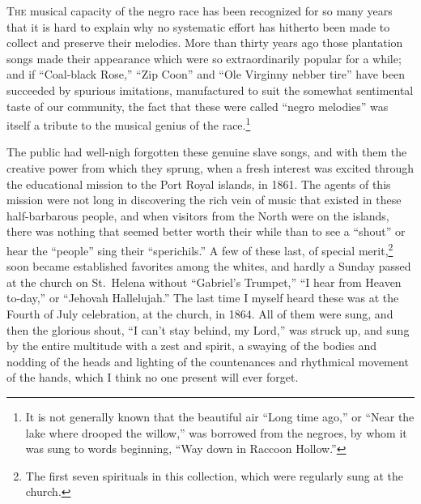 \documentclass[a5paper,10pt]{book}
\begin{document}
\textsc{The} musical capacity of the negro race has been recognized
for so many years that it is hard to explain why no systematic effort
has hitherto been made to collect and preserve their melodies.  More
than thirty years ago those plantation songs made their appearance
which were so extraordinarily popular for a while; and if ``Coal-black
Rose,'' ``Zip Coon'' and ``Ole Virginny nebber tire'' have been
succeeded by spurious imitations, manufactured to suit the somewhat
sentimental taste of our community, the fact that these were called
``negro melodies'' was itself a tribute to the musical genius of the
race.\footnote{It is not generally known that the beautiful air ``Long
time ago,'' or ``Near the lake where drooped the willow,'' was
borrowed from the negroes, by whom it was sung to words beginning,
``Way down in Raccoon Hollow.''}

The public had well-nigh forgotten these genuine slave songs, and with
them the creative power from which they sprung, when a fresh interest
was excited through the educational mission to the Port Royal islands,
in 1861.  The agents of this mission were not long in discovering the
rich vein of music that existed in these half-barbarous people, and
when visitors from the North were on the islands, there was nothing
that seemed better worth their while than to see a ``shout'' or hear
the ``people'' sing their ``sperichils.''  A few of these last, of
special merit,\footnote{The first seven spirituals in this collection,
which were regularly sung at the church.} soon became established
favorites among the whites, and hardly a Sunday passed at the church
on St.~Helena without ``Gabriel's Trumpet,'' ``I hear from Heaven
to-day,'' or ``Jehovah Hallelujah.''  The last time I myself heard
these was at the Fourth of July celebration, at the church, in 1864.
All of them were sung, and then the glorious shout, ``I can't stay
behind, my Lord,'' was struck up, and sung by the entire multitude
with a zest and spirit, a swaying of the bodies and nodding of the
heads and lighting of the countenances and rhythmical movement of the
hands, which I think no one present will ever forget.
\end{document}
